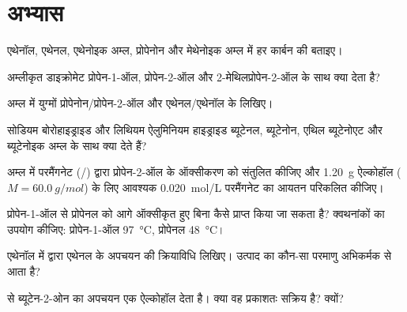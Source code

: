 \section{अभ्यास}

\begin{exercise}[$\star$]\label{exo:b1:organic-redox:1}
एथेनॉल, एथेनल, एथेनोइक
अम्ल, प्रोपेनोन और मेथेनोइक अम्ल में हर कार्बन की  बताइए।
\end{exercise}

\begin{exercise}[$\star$]\label{exo:b1:organic-redox:2}
अम्लीकृत डाइक्रोमेट प्रोपेन-1-ऑल, प्रोपेन-2-ऑल और
2-मेथिलप्रोपेन-2-ऑल के साथ क्या देता है?
\end{exercise}

\begin{exercise}[$\star$]\label{exo:b1:organic-redox:3}
अम्ल में युग्मों प्रोपेनोन/प्रोपेन-2-ऑल और
एथेनल/एथेनॉल के  लिखिए।
\end{exercise}

\begin{exercise}[$\star$]\label{exo:b1:organic-redox:4}
सोडियम बोरोहाइड्राइड और लिथियम ऐलुमिनियम हाइड्राइड
ब्यूटेनल, ब्यूटेनोन, एथिल ब्यूटेनोएट और ब्यूटेनोइक अम्ल के साथ क्या देते हैं?
\end{exercise}

\begin{exercise}[$\star\star$]\label{exo:b1:organic-redox:5}
अम्ल में परमैंगनेट (/) द्वारा प्रोपेन-2-ऑल के ऑक्सीकरण को संतुलित कीजिए
और \qty{1.20}{g} ऐल्कोहॉल ($M = \qty{60.0}{g/mol}$) के लिए आवश्यक
\qty{0.020}{mol/L} परमैंगनेट का आयतन परिकलित कीजिए।
\end{exercise}

\begin{exercise}[$\star\star$]\label{exo:b1:organic-redox:6}
प्रोपेन-1-ऑल से प्रोपेनल को आगे ऑक्सीकृत हुए बिना कैसे प्राप्त किया जा सकता है?
क्वथनांकों का उपयोग कीजिए: प्रोपेन-1-ऑल \qty{97}{\celsius}, प्रोपेनल
\qty{48}{\celsius}।
\end{exercise}

\begin{exercise}[$\star\star$]\label{exo:b1:organic-redox:7}
एथेनॉल में  द्वारा एथेनल के अपचयन की क्रियाविधि लिखिए।
उत्पाद का कौन-सा परमाणु अभिकर्मक से आता है?
\end{exercise}

\begin{exercise}[$\star\star$]\label{exo:b1:organic-redox:8}
 से ब्यूटेन-2-ओन का अपचयन एक  ऐल्कोहॉल देता है। क्या वह
प्रकाशतः सक्रिय है? क्यों?
\end{exercise}


